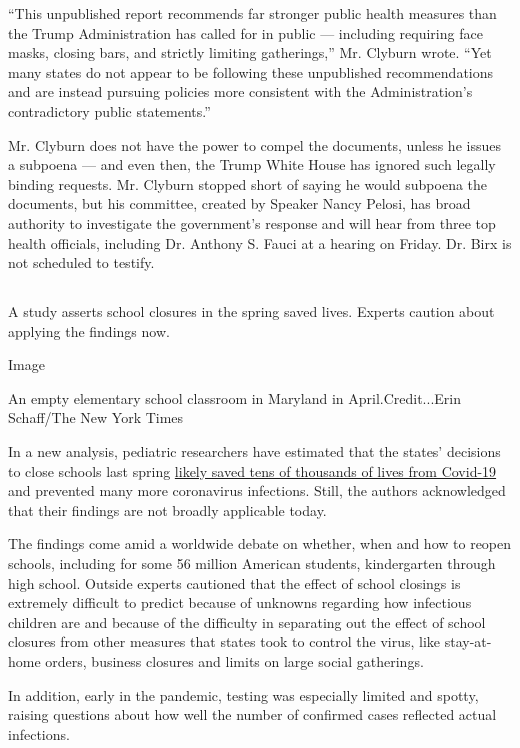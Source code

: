 ``This unpublished report recommends far stronger public health measures
than the Trump Administration has called for in public --- including
requiring face masks, closing bars, and strictly limiting gatherings,''
Mr. Clyburn wrote. ``Yet many states do not appear to be following these
unpublished recommendations and are instead pursuing policies more
consistent with the Administration's contradictory public statements.''

Mr. Clyburn does not have the power to compel the documents, unless he
issues a subpoena --- and even then, the Trump White House has ignored
such legally binding requests. Mr. Clyburn stopped short of saying he
would subpoena the documents, but his committee, created by Speaker
Nancy Pelosi, has broad authority to investigate the government's
response and will hear from three top health officials, including Dr.
Anthony S. Fauci at a hearing on Friday. Dr. Birx is not scheduled to
testify.

\hypertarget{-5}{%
\subsection{}\label{-5}}

A study asserts school closures in the spring saved lives. Experts
caution about applying the findings now.

Image

An empty elementary school classroom in Maryland in April.Credit...Erin
Schaff/The New York Times

In a new analysis, pediatric researchers have estimated that the states'
decisions to close schools last spring
\href{https://www.nytimes.com/2020/07/29/health/covid-school-reopening.html}{likely
saved tens of thousands of lives from Covid-19} and prevented many more
coronavirus infections. Still, the authors acknowledged that their
findings are not broadly applicable today.

The findings come amid a worldwide debate on whether, when and how to
reopen schools, including for some 56 million American students,
kindergarten through high school. Outside experts cautioned that the
effect of school closings is extremely difficult to predict because of
unknowns regarding how infectious children are and because of the
difficulty in separating out the effect of school closures from other
measures that states took to control the virus, like stay-at-home
orders, business closures and limits on large social gatherings.

In addition, early in the pandemic, testing was especially limited and
spotty, raising questions about how well the number of confirmed cases
reflected actual infections.

